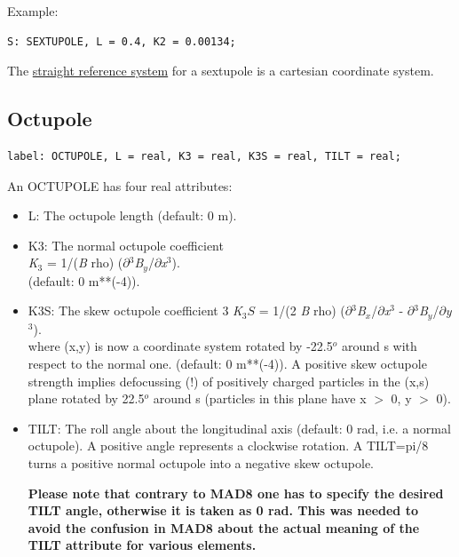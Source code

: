 Example: 
\begin{verbatim}
S: SEXTUPOLE, L = 0.4, K2 = 0.00134;
\end{verbatim} 

The \href{local_system.html#straight}{straight reference system} for a
sextupole is a cartesian coordinate system.   


%
\subsection{Octupole}
\label{sec:octupole}

\begin{verbatim}
label: OCTUPOLE, L = real, K3 = real, K3S = real, TILT = real;
\end{verbatim} 

An OCTUPOLE has four real attributes: 
\begin{itemize}
   \item L: The octupole length (default: 0 m). 

   \item K3: The normal octupole coefficient \\
     \textit{K}$_3$ = 1/(\textit{B} rho)
     ($\partial$$^3$\textit{B$_y$}/$\partial$\textit{x}$^3$). \\ 
     (default: 0 m**(-4)). 

   \item K3S: The skew octupole coefficient 
3%
     \textit{K}$_3S$ = 1/(2 \textit{B} rho)
     ($\partial$$^3$\textit{B$_x$}/$\partial$\textit{x}$^3$ -
     $\partial$$^3$\textit{B$_y$}/$\partial$\textit{y}$^3$). \\
     where (x,y) is now a coordinate system rotated by -22.5$^o$ around
     s with respect to the normal one. (default: 0 m**(-4)). A positive
     skew octupole strength implies defocussing (!) of positively
     charged particles in the (x,s) plane rotated by 22.5$^o$ around s
     (particles in this plane have x $>$ 0, y $>$ 0).  

   \item TILT: The roll angle about the longitudinal axis (default: 0
     rad, i.e. a normal octupole). A positive angle represents a
     clockwise rotation. A TILT=pi/8 turns a positive normal octupole
     into a negative skew octupole.  

     \textbf{  Please note that contrary to MAD8 one has to specify the
       desired TILT angle, otherwise it is taken as 0 rad. This was
       needed to avoid the confusion in MAD8 about the actual meaning of
       the TILT attribute for various elements. }

\end{itemize}

